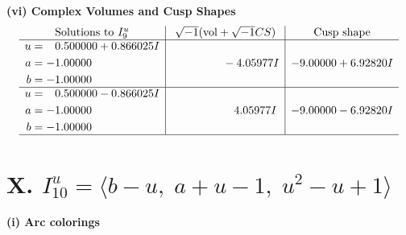 \documentclass[1p]{elsarticle_modified}
\theoremstyle{definition}
\newcommand{\I}{\sqrt{-1}}
\begin{document}
\newpage\flushleft \textbf{(vi) Complex Volumes and Cusp Shapes}
$$\begin{array}{c|c|c}  
\text{Solutions to }I^u_{9}& \I (\text{vol} + \sqrt{-1}CS) & \text{Cusp shape}\\
 \hline 
\begin{aligned}
u &= \phantom{-}0.500000 + 0.866025 I \\
a &= -1.00000\phantom{ +0.000000I} \\
b &= -1.00000\phantom{ +0.000000I}\end{aligned}
 & \phantom{-0.000000 } -4.05977 I & -9.00000 + 6.92820 I \\ \hline\begin{aligned}
u &= \phantom{-}0.500000 - 0.866025 I \\
a &= -1.00000\phantom{ +0.000000I} \\
b &= -1.00000\phantom{ +0.000000I}\end{aligned}
 & \phantom{-0.000000 -}4.05977 I & -9.00000 - 6.92820 I\\
 \hline 
 \end{array}$$\newpage\newpage\renewcommand{\arraystretch}{1}
\centering \section*{X. $I^u_{10}= \langle b- u,\;a+u-1,\;u^2- u+1 \rangle$}
\flushleft \textbf{(i) Arc colorings}\\
\end{document}
